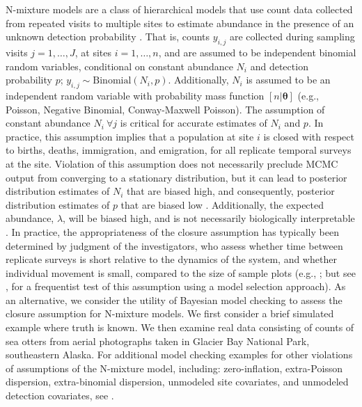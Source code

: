 \documentclass[12pt,english]{article}
\begin{document}
\begin{spacing}{1.9}
N-mixture models are a class of hierarchical models that use count
data collected from repeated visits to multiple sites to estimate
abundance in the presence of an unknown detection probability
\citep{Royle2004a}. That is, counts $y_{i,j}$ are collected during
sampling visits $j=1,\ldots,J$, at sites $i=1,\ldots,n$, and are
assumed to be independent binomial random variables, conditional on
constant abundance $N_i$ and detection probability $p$;
$y_{i,j} \sim \text{Binomial}(N_i,p)$. Additionally, $N_i$ is assumed
to be an independent random variable with probability mass function
$[n|\boldsymbol{\theta}]$ (e.g., Poisson, Negative Binomial,
Conway-Maxwell Poisson).  The assumption of constant abundance
$N_i~ \forall j$ is critical for accurate estimates of $N_i$ and
$p$. In practice, this assumption implies that a population at site
$i$ is closed with respect to births, deaths, immigration, and
emigration, for all replicate temporal surveys at the site. Violation
of this assumption does not necessarily preclude MCMC output from
converging to a stationary distribution, but it can lead to posterior
distribution estimates of $N_i$ that are biased high, and
consequently, posterior distribution estimates of $p$ that are biased
low \citep[][Fig. \ref{fig:violation}]{kery2015applied}. Additionally,
the expected abundance, $\lambda$, will be biased high, and is not
necessarily biologically interpretable \citep[e.g., it does not
necessarily provide an estimate of the total number of individuals
ever associated with a site,
c.f. \emph{superpopulation};][]{kery2015applied}. In practice, the
appropriateness of the closure assumption has typically been
determined by judgment of the investigators, who assess whether time
between replicate surveys is short relative to the dynamics of the
system, and whether individual movement is small, compared to the size
of sample plots (e.g., \citealt{efford2012occupancy}; but see
\citealt{DailMadsen2011}, for a frequentist test of this assumption
using a model selection approach). As an alternative, we consider the
utility of Bayesian model checking to assess the closure assumption
for N-mixture models. We first consider a brief simulated example
where truth is known. We then examine real data consisting of counts
of sea otters from aerial photographs taken in Glacier Bay National
Park, southeastern Alaska. For additional model checking examples for
other violations of assumptions of the N-mixture model, including:
zero-inflation, extra-Poisson dispersion, extra-binomial dispersion,
unmodeled site covariates, and unmodeled detection covariates, see
\cite[][section 6.8]{kery2015applied}.


\end{spacing}
\end{document}
